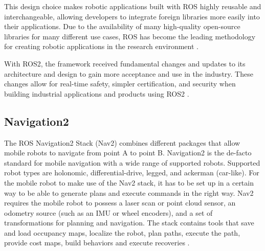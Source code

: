 This design choice makes robotic applications built with ROS highly reusable and interchangeable, allowing developers to integrate foreign libraries more easily into their applications. 
Due to the availability of many high-quality open-source libraries for many different use cases, ROS has become the leading methodology for creating robotic applications in the research environment \cite{quigley2009}. 

With ROS2, the framework received fundamental changes and updates to its architecture and design to gain more acceptance and use in the industry. These changes allow for real-time safety, simpler certification, and security when building industrial applications and products using ROS2 \cite{ros2022}.  

\subsection{Navigation2}
The ROS Navigation2 Stack (Nav2) combines different packages that allow mobile robots to navigate from point A to point B. Navigation2 is the de-facto standard for mobile navigation with a wide range of supported robots. Supported robot types are holonomic, differential-drive, legged, and ackerman (car-like). For the mobile robot to make use of the Nav2 stack, it has to be set up in a certain way to be able to generate plans and execute commands in the right way. Nav2 requires the mobile robot to possess a laser scan or point cloud sensor, an odometry source (such as an IMU or wheel encoders), and a set of transformations for planning and navigation. 
The stack contains tools that save and load occupancy maps, localize the robot, plan paths, execute the path, provide cost maps, build behaviors and execute recoveries \cite{macenski2020}. 

